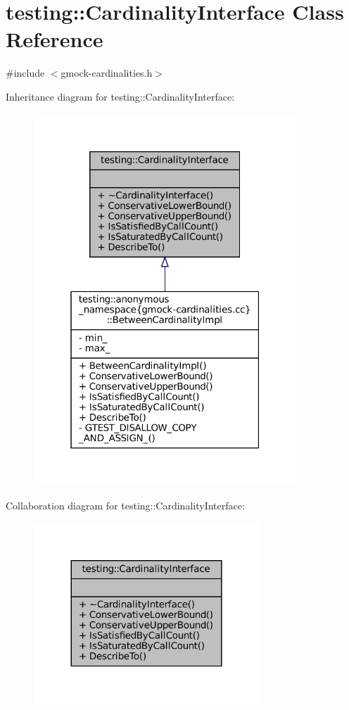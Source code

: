 \hypertarget{classtesting_1_1CardinalityInterface}{}\section{testing\+:\+:Cardinality\+Interface Class Reference}
\label{classtesting_1_1CardinalityInterface}


{\ttfamily \#include $<$gmock-\/cardinalities.\+h$>$}



Inheritance diagram for testing\+:\+:Cardinality\+Interface\+:
\nopagebreak
\begin{figure}[H]
\begin{center}
\leavevmode
\includegraphics[width=280pt]{classtesting_1_1CardinalityInterface__inherit__graph}
\end{center}
\end{figure}


Collaboration diagram for testing\+:\+:Cardinality\+Interface\+:
\nopagebreak
\begin{figure}[H]
\begin{center}
\leavevmode
\includegraphics[width=240pt]{classtesting_1_1CardinalityInterface__coll__graph}
\end{center}
\end{figure}
